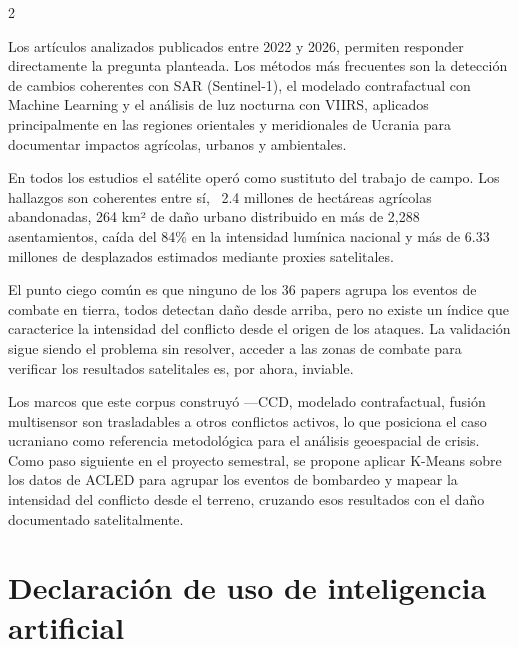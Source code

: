 \documentclass[12pt, a4paper]{article}
\begin{document}
\begin{multicols}{2}

Los artículos analizados publicados entre 2022 y 2026, permiten responder directamente la pregunta planteada. Los métodos más frecuentes son la detección de cambios coherentes con SAR (Sentinel-1), el modelado contrafactual con Machine Learning y el análisis de luz nocturna con VIIRS, aplicados principalmente en las regiones orientales y meridionales de Ucrania para documentar impactos agrícolas, urbanos y ambientales.

En todos los estudios el satélite operó como sustituto del trabajo de campo. Los hallazgos son coherentes entre sí, ~2.4 millones de hectáreas agrícolas abandonadas, 264 km² de daño urbano distribuido en más de 2,288 asentamientos, caída del 84\% en la intensidad lumínica nacional y más de 6.33 millones de desplazados estimados mediante proxies satelitales.

El punto ciego común es que ninguno de los 36 papers agrupa los eventos de combate en tierra, todos detectan daño desde arriba, pero no existe un índice que caracterice la intensidad del conflicto desde el origen de los ataques. La validación sigue siendo el problema sin resolver, acceder a las zonas de combate para verificar los resultados satelitales es, por ahora, inviable.

Los marcos que este corpus construyó —CCD, modelado contrafactual, fusión multisensor son trasladables a otros conflictos activos, lo que posiciona el caso ucraniano como referencia metodológica para el análisis geoespacial de crisis. Como paso siguiente en el proyecto semestral, se propone aplicar K-Means sobre los datos de ACLED para agrupar los eventos de bombardeo y mapear la intensidad del conflicto desde el terreno, cruzando esos resultados con el daño documentado satelitalmente.

\end{multicols}

\clearpage

\FloatBarrier

\section*{Declaración de uso de inteligencia artificial}
\end{document}
